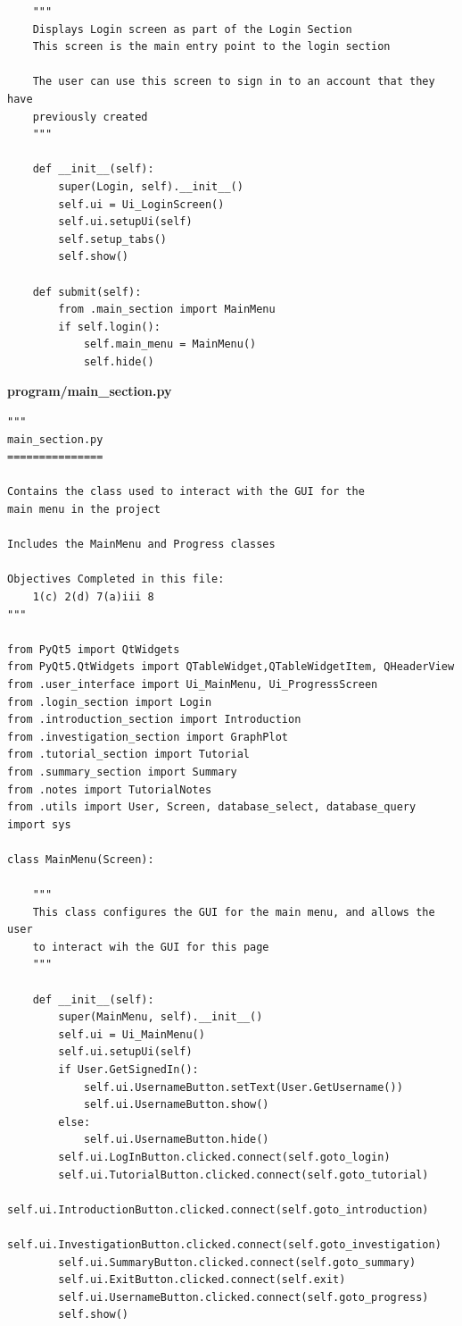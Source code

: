 \documentclass[12pt]{article}
\begin{document}
\begin{lstlisting}
    """
    Displays Login screen as part of the Login Section
    This screen is the main entry point to the login section

    The user can use this screen to sign in to an account that they have
    previously created
    """

    def __init__(self):
        super(Login, self).__init__()
        self.ui = Ui_LoginScreen()
        self.ui.setupUi(self)
        self.setup_tabs()
        self.show()

    def submit(self):
        from .main_section import MainMenu
        if self.login():
            self.main_menu = MainMenu()
            self.hide()
\end{lstlisting}


\textbf{program/main\_section.py}
\begin{lstlisting}
"""
main_section.py
===============

Contains the class used to interact with the GUI for the
main menu in the project

Includes the MainMenu and Progress classes

Objectives Completed in this file:
    1(c) 2(d) 7(a)iii 8
"""

from PyQt5 import QtWidgets
from PyQt5.QtWidgets import QTableWidget,QTableWidgetItem, QHeaderView
from .user_interface import Ui_MainMenu, Ui_ProgressScreen
from .login_section import Login
from .introduction_section import Introduction
from .investigation_section import GraphPlot
from .tutorial_section import Tutorial
from .summary_section import Summary
from .notes import TutorialNotes
from .utils import User, Screen, database_select, database_query
import sys

class MainMenu(Screen):

    """
    This class configures the GUI for the main menu, and allows the user
    to interact wih the GUI for this page
    """

    def __init__(self):
        super(MainMenu, self).__init__()
        self.ui = Ui_MainMenu()
        self.ui.setupUi(self)
        if User.GetSignedIn():
            self.ui.UsernameButton.setText(User.GetUsername())
            self.ui.UsernameButton.show()
        else:
            self.ui.UsernameButton.hide()
        self.ui.LogInButton.clicked.connect(self.goto_login)
        self.ui.TutorialButton.clicked.connect(self.goto_tutorial)
        self.ui.IntroductionButton.clicked.connect(self.goto_introduction)
        self.ui.InvestigationButton.clicked.connect(self.goto_investigation)
        self.ui.SummaryButton.clicked.connect(self.goto_summary)
        self.ui.ExitButton.clicked.connect(self.exit)
        self.ui.UsernameButton.clicked.connect(self.goto_progress)
        self.show()


\end{lstlisting}
\end{document}
